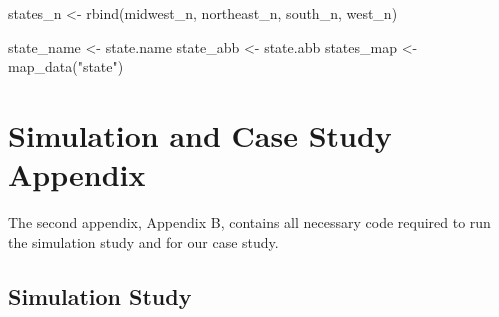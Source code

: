 \documentclass[12pt, twoside]{amherstthesis}
\newenvironment{Shaded}{\begin{snugshade}}{\end{snugshade}}
\newcommand{\FunctionTok}[1]{\textcolor[rgb]{0.00,0.00,0.00}{#1}}
\newcommand{\NormalTok}[1]{#1}
\newcommand{\OtherTok}[1]{\textcolor[rgb]{0.56,0.35,0.01}{#1}}
\newcommand{\StringTok}[1]{\textcolor[rgb]{0.31,0.60,0.02}{#1}}
\begin{document}
\begin{Shaded}
\begin{Highlighting}[]
\NormalTok{states\_n }\OtherTok{\textless{}{-}} \FunctionTok{rbind}\NormalTok{(midwest\_n, northeast\_n, south\_n, west\_n)}

\NormalTok{state\_name }\OtherTok{\textless{}{-}}\NormalTok{ state.name}
\NormalTok{state\_abb }\OtherTok{\textless{}{-}}\NormalTok{ state.abb}
\NormalTok{states\_map }\OtherTok{\textless{}{-}} \FunctionTok{map\_data}\NormalTok{(}\StringTok{"state"}\NormalTok{)}
\end{Highlighting}
\end{Shaded}
\hypertarget{simulation-and-case-study-appendix}{%
\chapter{Simulation and Case Study Appendix}\label{simulation-and-case-study-appendix}}

The second appendix, Appendix B, contains all necessary code required to run the simulation study and for our case study.

\hypertarget{simulation-study}{%
\section{Simulation Study}\label{simulation-study}}
\end{document}
